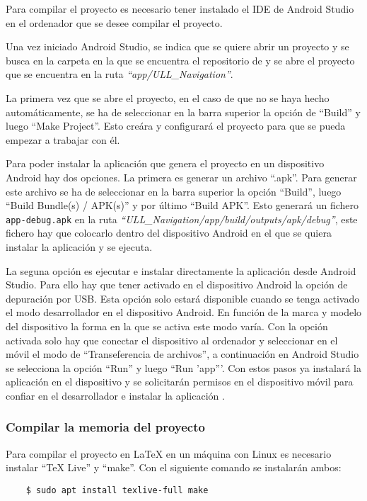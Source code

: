 Para compilar el proyecto es necesario tener instalado el IDE de Android Studio en el ordenador que se desee compilar el proyecto.

Una vez iniciado Android Studio, se indica que se quiere abrir un proyecto y se busca en la carpeta en la que se encuentra el repositorio de \ULLAR{} y se abre el proyecto que se encuentra en la ruta \textit{``app/ULL\_Navigation''}. 

La primera vez que se abre el proyecto, en el caso de que no se haya hecho automáticamente, se ha de seleccionar en la barra superior la opción de ``Build'' y luego ``Make Project''. 
Esto creára y configurará el proyecto para que se pueda empezar a trabajar con él.

Para poder instalar la aplicación que genera el proyecto en un dispositivo Android hay dos opciones. 
La primera es generar un archivo ``.apk''. Para generar este archivo se ha de seleccionar en la barra superior la opción ``Build'', luego ``Build Bundle(s) / APK(s)'' y por último ``Build APK''. 
Esto generará un fichero \texttt{app-debug.apk} en la ruta \textit{``ULL\_Navigation/app/build/outputs/apk/debug''}, este fichero hay que colocarlo dentro del dispositivo Android en el que se quiera instalar la aplicación y se ejecuta.

La seguna opción es ejecutar e instalar directamente la aplicación desde Android Studio. 
Para ello hay que tener activado en el dispositivo Android la opción de depuración por USB. 
Esta opción solo estará disponible cuando se tenga activado el modo desarrollador en el dispositivo Android. 
En función de la marca y modelo del dispositivo la forma en la que se activa este modo varía. 
Con la opción activada solo hay que conectar el dispositivo al ordenador y seleccionar en el móvil el modo de ``Transeferencia de archivos'', a continuación en Android Studio se selecciona la opción ``Run'' y luego ``Run 'app'''. 
Con estos pasos ya instalará la aplicación en el dispositivo y se solicitarán permisos en el dispositivo móvil para confiar en el desarrollador e instalar la aplicación \ULLAR{}. 


\subsubsection{Compilar la memoria del proyecto}
Para compilar el proyecto en LaTeX en un máquina con Linux es necesario instalar ``TeX Live'' y ``make''. Con el siguiente comando se instalarán ambos:
\begin{lstlisting}
    $ sudo apt install texlive-full make 
\end{lstlisting}

